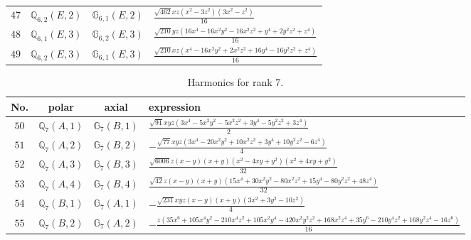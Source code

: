 \documentclass[fleqn,8pt,landscape]{jsarticle}
\begin{document}
\begin{table}[ht!]
\begin{center}
\begin{tabular}{cccl}
$ 47 $ & $ \mathbb{Q}_{6,2}(E,2) $ & $ \mathbb{G}_{6,1}(E,2) $ & $ \frac{\sqrt{462} x z \left(x^{2} - 3 z^{2}\right) \left(3 x^{2} - z^{2}\right)}{16} $ \\
$ 48 $ & $ \mathbb{Q}_{6,1}(E,3) $ & $ \mathbb{G}_{6,2}(E,3) $ & $ \frac{\sqrt{210} y z \left(16 x^{4} - 16 x^{2} y^{2} - 16 x^{2} z^{2} + y^{4} + 2 y^{2} z^{2} + z^{4}\right)}{16} $ \\
$ 49 $ & $ \mathbb{Q}_{6,2}(E,3) $ & $ \mathbb{G}_{6,1}(E,3) $ & $ \frac{\sqrt{210} x z \left(x^{4} - 16 x^{2} y^{2} + 2 x^{2} z^{2} + 16 y^{4} - 16 y^{2} z^{2} + z^{4}\right)}{16} $ \\
 \hline \hline
\end{tabular}
\end{center}
\end{table}
\begin{table}[ht!]
\begin{center}
\caption{Harmonics for rank 7.}
\renewcommand{\arraystretch}{1.3}
\begin{tabular}{cccl} \hline \hline
No. & polar & axial & expression \\ \hline
$ 50 $ & $ \mathbb{Q}_{7}(A,1) $ & $ \mathbb{G}_{7}(B,1) $ & $ \frac{\sqrt{91} x y z \left(3 x^{4} - 5 x^{2} y^{2} - 5 x^{2} z^{2} + 3 y^{4} - 5 y^{2} z^{2} + 3 z^{4}\right)}{2} $ \\
$ 51 $ & $ \mathbb{Q}_{7}(A,2) $ & $ \mathbb{G}_{7}(B,2) $ & $ - \frac{\sqrt{77} x y z \left(3 x^{4} - 20 x^{2} y^{2} + 10 x^{2} z^{2} + 3 y^{4} + 10 y^{2} z^{2} - 6 z^{4}\right)}{4} $ \\
$ 52 $ & $ \mathbb{Q}_{7}(A,3) $ & $ \mathbb{G}_{7}(B,3) $ & $ \frac{\sqrt{6006} z \left(x - y\right) \left(x + y\right) \left(x^{2} - 4 x y + y^{2}\right) \left(x^{2} + 4 x y + y^{2}\right)}{32} $ \\
$ 53 $ & $ \mathbb{Q}_{7}(A,4) $ & $ \mathbb{G}_{7}(B,4) $ & $ \frac{\sqrt{42} z \left(x - y\right) \left(x + y\right) \left(15 x^{4} + 30 x^{2} y^{2} - 80 x^{2} z^{2} + 15 y^{4} - 80 y^{2} z^{2} + 48 z^{4}\right)}{32} $ \\
$ 54 $ & $ \mathbb{Q}_{7}(B,1) $ & $ \mathbb{G}_{7}(A,1) $ & $ - \frac{\sqrt{231} x y z \left(x - y\right) \left(x + y\right) \left(3 x^{2} + 3 y^{2} - 10 z^{2}\right)}{4} $ \\
$ 55 $ & $ \mathbb{Q}_{7}(B,2) $ & $ \mathbb{G}_{7}(A,2) $ & $ - \frac{z \left(35 x^{6} + 105 x^{4} y^{2} - 210 x^{4} z^{2} + 105 x^{2} y^{4} - 420 x^{2} y^{2} z^{2} + 168 x^{2} z^{4} + 35 y^{6} - 210 y^{4} z^{2} + 168 y^{2} z^{4} - 16 z^{6}\right)}{16} $ \\

\end{tabular}
\end{center}
\end{table}
\end{document}
